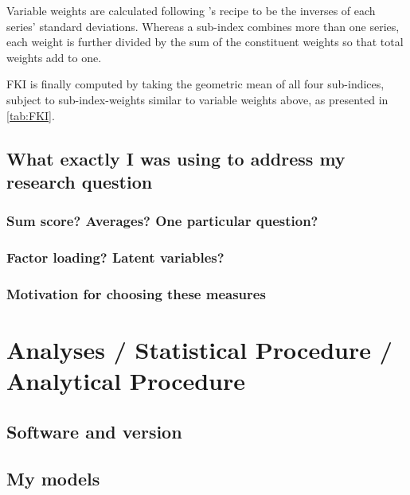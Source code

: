 \documentclass[a4paper,11pt,UKenglish,twoside,openright]{report}\usepackage[]{graphicx}\usepackage[]{color}
\begin{document}
Variable weights are calculated following \textcite{olivermarquez:2020}'s recipe to be the inverses of each series' standard deviations. Whereas a sub-index combines more than one series, each weight is further divided by the sum of the constituent weights so that total weights add to one.

FKI is finally computed by taking the geometric mean of all four sub-indices, subject to sub-index-weights similar to variable weights above, as presented in \cref{tab:FKI}.



\newpage

\section{What exactly I was using to address my research question}

\subsection{Sum score? Averages? One particular question?}

\subsection{Factor loading? Latent variables?}

\subsection{Motivation for choosing these measures}




\chapter{Analyses / Statistical Procedure / Analytical Procedure}
\label{chp:4}


\section{Software and version}

\section{My models}
\end{document}
